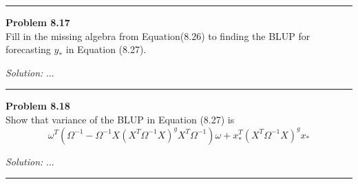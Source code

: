 \documentclass[a4paper, 11pt]{article}
\newenvironment{problem}[2][Problem]
    { \begin{mdframed}[backgroundcolor=gray!20] \textbf{#1 #2} \\}
    {  \end{mdframed}}
\newenvironment{solution}
    {\textit{Solution:}}
    {}
\begin{document}
\noindent\rule{7in}{2.8pt}


\begin{problem}{8.17}
Fill in the missing algebra from Equation(8.26) to finding the BLUP for forecasting $y_{*}$ in Equation (8.27).
\end{problem}
\begin{solution}
...
\end{solution} 

\noindent\rule{7in}{2.8pt}

\begin{problem}{8.18}
Show that variance of the BLUP in Equation (8.27) is 
$$\omega^T(\Omega^{-1}-\Omega^{-1}X(X^T\Omega^{-1}X)^gX^T\Omega^{-1})\omega+x_{*}^T(X^T\Omega^{-1}X)^gx_{*}$$
\end{problem}
\begin{solution}
...
\end{solution} 

\noindent\rule{7in}{2.8pt}
\end{document}
